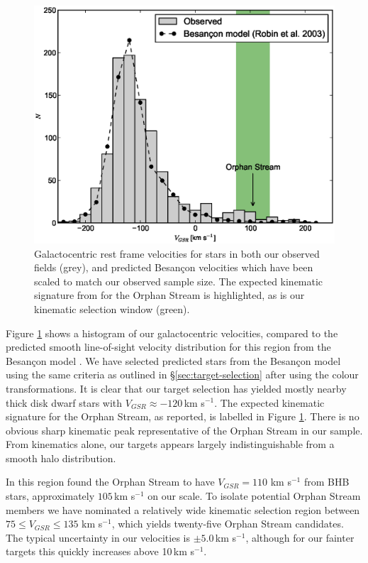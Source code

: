 \documentclass[10pt,apjl]{emulateapj}
\begin{document}
\begin{figure}[h]
	\includegraphics[width=\columnwidth]{./fig1.eps}
	\caption{Galactocentric rest frame velocities for stars in both our observed fields (grey), and predicted Besan\c{c}on velocities which have been scaled to match our observed sample size. The expected kinematic signature from \citet{Newberg_et-al_2010} for the Orphan Stream is highlighted, as is our kinematic selection window (green).}
	\label{fig:velocities}
\end{figure}

Figure \ref{fig:velocities} shows a histogram of our galactocentric velocities, compared to the predicted smooth line-of-sight velocity distribution for this region from the Besan\c{c}on model \citep{Robin_et-al_2003}. We have selected predicted stars from the Besan\c{c}on model using the same criteria as outlined in \S\ref{sec:target-selection} after using the \citet{Jordi_et-al_2006} colour transformations. It is clear that our target selection has yielded mostly nearby thick disk dwarf stars with $V_{GSR} \approx -120$\,km s$^{-1}$. The expected kinematic signature for the Orphan Stream, as \citet{Newberg_et-al_2010} reported, is labelled in Figure \ref{fig:velocities}. There is no obvious sharp kinematic peak representative of the Orphan Stream in our sample. From kinematics alone, our targets appears largely indistinguishable from a smooth halo distribution.

In this region \citet{Newberg_et-al_2010} found the Orphan Stream to have $V_{GSR} = 110$ km s$^{-1}$ from BHB stars, approximately $105$\,km s$^{-1}$ on our scale. To isolate potential Orphan Stream members we have nominated a relatively wide kinematic selection region between $75 \leq V_{GSR} \leq 135$ km s$^{-1}$, which yields twenty-five Orphan Stream candidates. The typical uncertainty in our velocities is $\pm{}5.0$\,km s$^{-1}$, although for our fainter targets this quickly increases above 10\,km s$^{-1}$.
\end{document}

